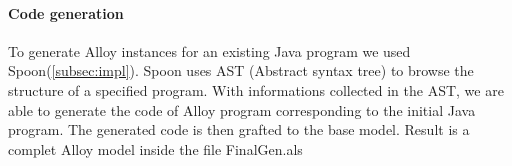 \paragraph{Code generation}
To generate Alloy instances for an existing Java program we used Spoon(\ref{subsec:impl}). Spoon uses AST (Abstract syntax tree)\cite{ast} to browse the structure of a specified program. With informations collected in the AST, we are able to generate the code of Alloy program corresponding to the initial Java program. The generated code is then grafted to the base model.
Result is a complet Alloy model inside the file FinalGen.als